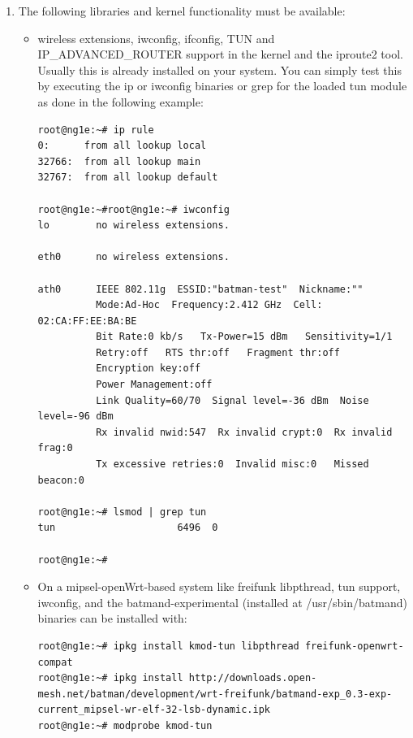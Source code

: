 \documentclass[11pt]{article}
\begin{document}
\begin{enumerate}

\item The following libraries and kernel functionality must be available:

\begin{itemize}
 \item wireless extensions, iwconfig, ifconfig, TUN and IP\_ADVANCED\_ROUTER support in the kernel and the iproute2 tool. Usually this is already installed on your system. You can simply test this by executing the ip or iwconfig binaries or grep for the loaded tun module as done in the following example:
%
\begin{small} \begin{verbatim}
root@ng1e:~# ip rule
0:      from all lookup local
32766:  from all lookup main
32767:  from all lookup default

root@ng1e:~#root@ng1e:~# iwconfig
lo        no wireless extensions.

eth0      no wireless extensions.

ath0      IEEE 802.11g  ESSID:"batman-test"  Nickname:""
          Mode:Ad-Hoc  Frequency:2.412 GHz  Cell: 02:CA:FF:EE:BA:BE
          Bit Rate:0 kb/s   Tx-Power=15 dBm   Sensitivity=1/1
          Retry:off   RTS thr:off   Fragment thr:off
          Encryption key:off
          Power Management:off
          Link Quality=60/70  Signal level=-36 dBm  Noise level=-96 dBm
          Rx invalid nwid:547  Rx invalid crypt:0  Rx invalid frag:0
          Tx excessive retries:0  Invalid misc:0   Missed beacon:0

root@ng1e:~# lsmod | grep tun
tun                     6496  0

root@ng1e:~#
\end{verbatim} \end{small} 

\item On a mipsel-openWrt-based system like freifunk libpthread, tun support, iwconfig, and the batmand-experimental (installed at /usr/sbin/batmand) binaries can be installed with:
%
\begin{tiny}  \begin{verbatim}
root@ng1e:~# ipkg install kmod-tun libpthread freifunk-openwrt-compat
root@ng1e:~# ipkg install http://downloads.open-mesh.net/batman/development/wrt-freifunk/batmand-exp_0.3-exp-current_mipsel-wr-elf-32-lsb-dynamic.ipk
root@ng1e:~# modprobe kmod-tun
\end{verbatim} \end{tiny} 


\end{itemize}
\end{enumerate}
\end{document}
